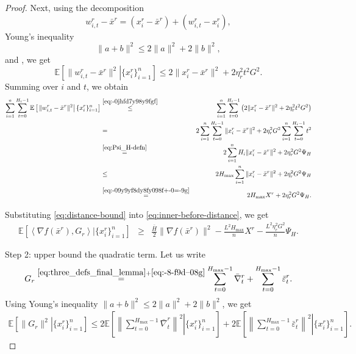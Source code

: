 \documentclass[10pt,a4paper]{amsart}
\newcommand{\ExpCond}[2]{{\mathbb{E}}\left[\left.#1\right\vert#2\right]}
\newcommand{\anglebr}[1]{\left\langle#1\right\rangle} %
\newcommand{\inner}[2]{\anglebr{#1, #2}}
\providecommand{\paragraph}{}
\begin{document}
\begin{proof}
Next, using the decomposition
\begin{equation*}
w_{i,t}^r-\bar x^r
=
(x_i^r-\bar x^r)+(w_{i,t}^r-x_i^r),
\end{equation*}
Young's inequality
\[
\|a+b\|^2 \le 2\|a\|^2+2\|b\|^2,
\]
and , we get
\begin{equation}\label{eq:-0jhfd7y98y9fgf}
\ExpCond{ \|w_{i,t}^r-\bar x^r\|^2 }{ \{x_i^r\}_{i=1}^n }
\le
2\|x_i^r-\bar x^r\|^2 + 2\eta_r^2 t^2 G^2.
\end{equation}
Summing over \(i\) and \(t\), we obtain
\begin{eqnarray}
\sum_{i=1}^n\sum_{t=0}^{H_i-1}
\ExpCond{ \|w_{i,t}^r-\bar x^r\|^2 }{ \{x_i^r\}_{i=1}^n }
&\overset{\eqref{eq:-0jhfd7y98y9fgf}}{\leq}&
\sum_{i=1}^n\sum_{t=0}^{H_i-1}
\left(
2\|x_i^r-\bar x^r\|^2 + 2\eta_r^2 t^2 G^2
\right)
\notag\\
&=&
2\sum_{i=1}^n\sum_{t=0}^{H_i-1}\|x_i^r-\bar x^r\|^2
+
2\eta_r^2 G^2\sum_{i=1}^n\sum_{t=0}^{H_i-1} t^2
\notag\\
&\overset{\eqref{eq:Psi_H-defn}}{=}&
2\sum_{i=1}^n H_i \|x_i^r-\bar x^r\|^2
+
2\eta_r^2 G^2 \Psi_H
\notag\\
&\leq&
2H_{\max}\sum_{i=1}^n \|x_i^r-\bar x^r\|^2
+
2\eta_r^2 G^2 \Psi_H
\notag\\
&\overset{\eqref{eq:-09y9yf8dy8fy098f+-0=-9g}}{=}&
2H_{\max}X^r + 2\eta_r^2 G^2\Psi_H.
\label{eq:distance-bound}
\end{eqnarray}

Substituting \eqref{eq:distance-bound} into \eqref{eq:inner-before-distance}, we get
\begin{eqnarray}
\ExpCond{ \inner{\nabla f(\bar x^r)}{G_r} }{ \{x_i^r\}_{i=1}^n }
&\ge&
\frac{\bar H}{2}\|\nabla f(\bar x^r)\|^2
-
\frac{L^2H_{\max}}{n}X^r
-
\frac{L^2\eta_r^2G^2}{n}\Psi_H.
\label{eq:inner-term-final}
\end{eqnarray}


\paragraph{Step 2: upper bound the quadratic term.}
Let us write
\[
G_r
\overset{\eqref{eq:three_defs_final_lemma}+\eqref{eq:-8-f9d--08g} }{=}
\sum_{t=0}^{H_{\max}-1}\bar\nabla_t^r
+
\sum_{t=0}^{H_{\max}-1}\bar\varepsilon_t^r.
\]
Using Young's inequality \(\|a+b\|^2\le 2\|a\|^2+2\|b\|^2\), we get
\begin{eqnarray}
\ExpCond{ \|G_r\|^2 }{ \{x_i^r\}_{i=1}^n }
\le
2\ExpCond{ \left\|\sum_{t=0}^{H_{\max}-1}\bar\nabla_t^r\right\|^2 }{ \{x_i^r\}_{i=1}^n }
+
2\ExpCond{ \left\|\sum_{t=0}^{H_{\max}-1}\bar\varepsilon_t^r\right\|^2 }{ \{x_i^r\}_{i=1}^n }.
\label{eq:G-split}
\end{eqnarray}


\end{proof}
\end{document}
